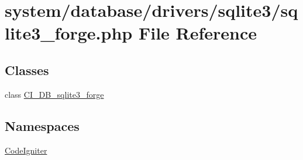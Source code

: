 \hypertarget{sqlite3__forge_8php}{}\section{system/database/drivers/sqlite3/sqlite3\+\_\+forge.php File Reference}
\label{sqlite3__forge_8php}
\subsection*{Classes}
\begin{DoxyCompactItemize}
\item 
class \mbox{\hyperlink{class_c_i___d_b__sqlite3__forge}{C\+I\+\_\+\+D\+B\+\_\+sqlite3\+\_\+forge}}
\end{DoxyCompactItemize}
\subsection*{Namespaces}
\begin{DoxyCompactItemize}
\item 
 \mbox{\hyperlink{namespace_code_igniter}{Code\+Igniter}}
\end{DoxyCompactItemize}
